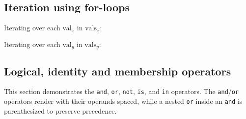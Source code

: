 \subsection*{Iteration using for-loops}

\medskip
\noindent{}

\medskip

\vspace{\baselineskip}

\noindent Iterating over each $\mathrm{val}_{x}$ in $\mathrm{vals}_{x}$:

\begin{list}{}{\setlength{\leftmargin}{1.5em}}\item[]
\noindent Iterating over each $\mathrm{val}_{y}$ in $\mathrm{vals}_{y}$:

\begin{list}{}{\setlength{\leftmargin}{1.5em}}\item[]
\medskip
\noindent{}

\medskip

\end{list}

\end{list}

\medskip
\noindent{}

\medskip

\subsection*{Logical, identity and membership operators}

\noindent This section demonstrates the \texttt{and}, \texttt{or}, \texttt{not}, \texttt{is}, and \texttt{in} operators. The \texttt{and}/\texttt{or} operators render with their operands spaced, while a nested \texttt{or} inside an \texttt{and} is parenthesized to preserve precedence.

